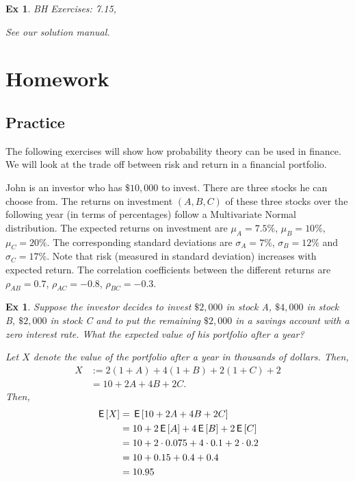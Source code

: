 \documentclass[a4paper,11pt]{article}
\newtheorem{exercise}[theorem]{Ex}
\begin{document}
\begin{exercise}
BH Exercises: 7.15,
\begin{solution}
See our solution manual.
\end{solution}
\end{exercise}


\section{Homework}
\label{sec:homework}

\subsection{Practice}
\label{sec:practice}


The following exercises will show how probability theory can be used in finance. We will look at the trade off between risk and return in a financial portfolio.

John is an investor who has $\$ 10,000$ to invest.
There are three stocks he can choose from.
The returns on investment $(A,B,C)$ of these three stocks over the following year (in terms of percentages) follow a Multivariate Normal distribution.
The expected returns on investment are $\mu_A = 7.5 \%$, $\mu_B = 10\%$, $\mu_C = 20\%$.
The corresponding standard deviations are $\sigma_A = 7\%$, $\sigma_B = 12 \%$ and $\sigma_C = 17\%$.
Note that risk (measured in standard deviation) increases with expected return.
The correlation coefficients between the different returns are $\rho_{AB} = 0.7$, $\rho_{AC} = -0.8$, $\rho_{BC} = -0.3$.

\begin{exercise}
Suppose the investor decides to invest $\$ 2,000$ in stock A, $\$4,000$ in stock B, $\$2,000$ in stock C and to put the remaining $\$ 2,000$ in a savings account with a zero interest rate. What the expected value of his portfolio after a year?
\begin{solution}
Let $X$ denote the value of the portfolio after a year in thousands of dollars. Then,
\begin{align}
    X &:= 2(1 + A) + 4(1 + B) + 2(1 + C) + 2 \\
    &= 10 + 2A + 4B + 2C.
\end{align}
Then,
\begin{align}
    \,\mathsf{E}\left[X\right] &= \,\mathsf{E}\left[ 10 + 2A + 4B + 2C \right] \\
    &= 10 + 2\,\mathsf{E}\left[A\right] + 4\,\mathsf{E}\left[B\right] + 2\,\mathsf{E}\left[C\right] \\
    &= 10 + 2\cdot 0.075  + 4 \cdot 0.1  + 2 \cdot 0.2 \\
    &= 10 + 0.15  + 0.4  + 0.4 \\
    &= 10.95
\end{align}
\end{solution}
\end{exercise}
\end{document}
